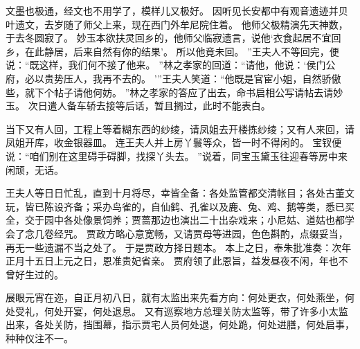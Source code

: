文墨也极通，经文也不用学了，模样儿又极好。
因听见长安都中有观音遗迹并贝叶遗文，去岁随了师父上来，现在西门外牟尼院住着。
他师父极精演先天神数，
于去冬圆寂了。
妙玉本欲扶灵回乡的，他师父临寂遗言，说他‘衣食起居不宜回乡，在此静居，后来自然有你的结果’。
所以他竟未回。
”王夫人不等回完，便说：“既这样，我们何不接了他来。
”林之孝家的回道：“请他，他说：‘侯门公府，必以贵势压人，我再不去的。
’”王夫人笑道：“他既是官宦小姐，自然骄傲些，就下个帖子请他何妨。
”林之孝家的答应了出去，命书启相公写请帖去请妙玉。
次日遣人备车轿去接等后话，暂且搁过，此时不能表白。
\par
当下又有人回，工程上等着糊东西的纱绫，请凤姐去开楼拣纱绫；又有人来回，请凤姐开库，收金银器皿。
连王夫人并上房丫鬟等众，皆一时不得闲的。
宝钗便说：“咱们别在这里碍手碍脚，找探丫头去。
”说着，同宝玉黛玉往迎春等房中来闲顽，无话。
\par
王夫人等日日忙乱，直到十月将尽，幸皆全备：各处监管都交清帐目；各处古董文玩，皆已陈设齐备；采办鸟雀的，自仙鹤、孔雀以及鹿、兔、鸡、鹅等类，悉已买全，交于园中各处像景饲养；贾蔷那边也演出二十出杂戏来；小尼姑、道姑也都学会了念几卷经咒。
贾政方略心意宽畅，又请贾母等进园，色色斟酌，点缀妥当，再无一些遗漏不当之处了。
于是贾政方择日题本。
本上之日，奉朱批准奏：次年正月十五日上元之日，恩准贵妃省亲。
贾府领了此恩旨，益发昼夜不闲，年也不曾好生过的。
\par
展眼元宵在迩，自正月初八日，就有太监出来先看方向：何处更衣，何处燕坐，何处受礼，何处开宴，何处退息。
又有巡察地方总理关防太监等，带了许多小太监出来，各处关防，挡围幕，指示贾宅人员何处退，何处跪，何处进膳，何处启事，种种仪注不一。
